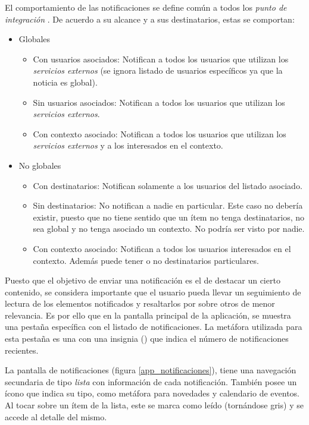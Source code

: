 El comportamiento de las notificaciones se define común a todos los \textit{punto de integración} .
De acuerdo a su alcance y a sus destinatarios, estas se comportan:
\begin{itemize}
\item Globales
\begin{itemize}
\item Con usuarios asociados: Notifican a todos los usuarios que utilizan los \textit{servicios externos} (se ignora listado de usuarios específicos ya que la noticia es global).
\item Sin usuarios asociados: Notifican a todos los usuarios que utilizan los \textit{servicios externos}.
\item Con contexto asociado: Notifican a todos los usuarios que utilizan los \textit{servicios externos} y a los interesados en el contexto.
\end{itemize}
\item No globales
\begin{itemize}
\item Con destinatarios: Notifican solamente a los usuarios del listado asociado.
\item Sin destinatarios: No notifican a nadie en particular. Este caso no debería existir, puesto que no tiene sentido que un ítem no tenga destinatarios, no sea global y no tenga asociado un contexto. No podría ser visto por nadie.
\item Con contexto asociado: Notifican a todos los usuarios interesados en el contexto. Además puede tener o no destinatarios particulares.
\end{itemize}
\end{itemize}

Puesto que el objetivo de enviar una notificación es el de destacar un cierto contenido, se considera importante que el usuario pueda llevar un seguimiento de lectura de los elementos notificados y resaltarlos por sobre otros de menor relevancia. Es por ello que en la pantalla principal de la aplicación, se muestra una pestaña específica con el listado de notificaciones. La metáfora utilizada para esta pestaña es una  con una insignia () que indica el número de notificaciones recientes.


La pantalla de notificaciones (figura \ref{app_notificaciones}), tiene una navegación secundaria de tipo \textit{lista} con información de cada notificación. También posee un ícono que indica su tipo, como metáfora para novedades y calendario de eventos. Al tocar sobre un ítem de la lista, este se marca como leído (tornándose gris) y se accede al detalle del mismo.

